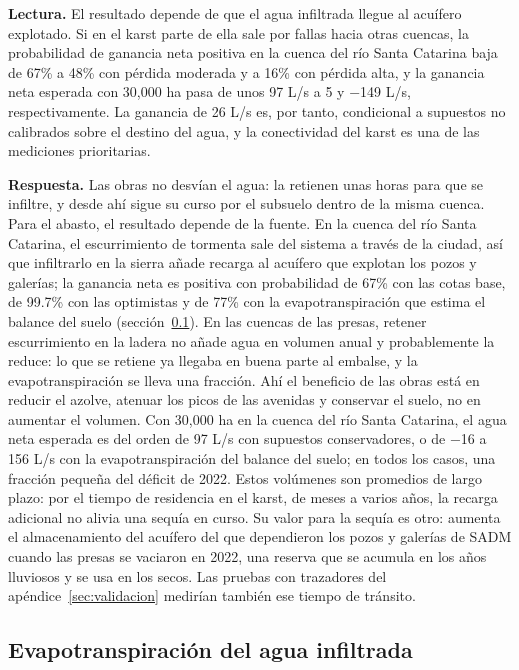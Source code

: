 \documentclass[11pt,letterpaper]{article}
\newcommand{\lectura}[1]{\par\noindent\textcolor{naranja}{\textbf{Lectura.}} #1\par}
\newcommand{\respuesta}[1]{\begin{cajarespuesta}\textbf{\color{naranja}Respuesta.} #1\end{cajarespuesta}}
\begin{document}
\lectura{El resultado depende de que el agua infiltrada llegue al acuífero explotado. Si en el karst parte de ella sale por fallas hacia otras cuencas, la probabilidad de ganancia neta positiva en la cuenca del río Santa Catarina baja de 67\% a 48\% con pérdida moderada y a 16\% con pérdida alta, y la ganancia neta esperada con 30,000 ha pasa de unos 97 L/s a 5 y −149 L/s, respectivamente. La ganancia de 26 L/s es, por tanto, condicional a supuestos no calibrados sobre el destino del agua, y la conectividad del karst es una de las mediciones prioritarias.}

\respuesta{Las obras no desvían el agua: la retienen unas horas para que se infiltre, y desde ahí sigue su curso por el subsuelo dentro de la misma cuenca. Para el abasto, el resultado depende de la fuente. En la cuenca del río Santa Catarina, el escurrimiento de tormenta sale del sistema a través de la ciudad, así que infiltrarlo en la sierra añade recarga al acuífero que explotan los pozos y galerías; la ganancia neta es positiva con probabilidad de 67\% con las cotas base, de 99.7\% con las optimistas y de 77\% con la evapotranspiración que estima el balance del suelo (sección~\ref{res:et}). En las cuencas de las presas, retener escurrimiento en la ladera no añade agua en volumen anual y probablemente la reduce: lo que se retiene ya llegaba en buena parte al embalse, y la evapotranspiración se lleva una fracción. Ahí el beneficio de las obras está en reducir el azolve, atenuar los picos de las avenidas y conservar el suelo, no en aumentar el volumen. Con 30,000 ha en la cuenca del río Santa Catarina, el agua neta esperada es del orden de 97 L/s con supuestos conservadores, o de −16 a 156 L/s con la evapotranspiración del balance del suelo; en todos los casos, una fracción pequeña del déficit de 2022. Estos volúmenes son promedios de largo plazo: por el tiempo de residencia en el karst, de meses a varios años, la recarga adicional no alivia una sequía en curso. Su valor para la sequía es otro: aumenta el almacenamiento del acuífero del que dependieron los pozos y galerías de SADM cuando las presas se vaciaron en 2022, una reserva que se acumula en los años lluviosos y se usa en los secos. Las pruebas con trazadores del apéndice~\ref{sec:validacion} medirían también ese tiempo de tránsito.}

\subsection{Evapotranspiración del agua infiltrada}\label{res:et}
\end{document}
